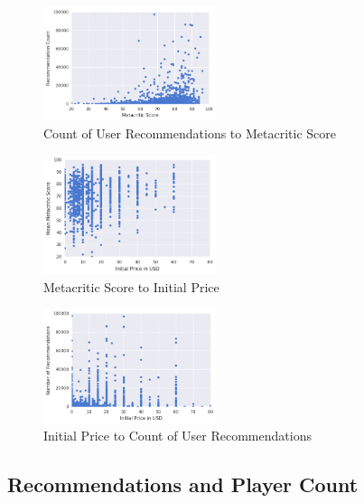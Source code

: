 \documentclass[10pt,journal,compsoc]{IEEEtran}
\begin{document}

\begin{figure}[h]
    \caption{Count of User Recommendations to Metacritic Score \label{fig:metacritic-recommendations}}
    \includegraphics[width=0.45\textwidth,keepaspectratio]{metacritic-recommendations-scatter}
\end{figure}

\begin{figure}[h]
    \caption{Metacritic Score to Initial Price \label{fig:metacritic-price}}
    \includegraphics[width=0.45\textwidth,keepaspectratio]{price-metacritic-scatter}
\end{figure}

\begin{figure}[h]
    \caption{Initial Price to Count of User Recommendations \label{fig:price-recommendations}}
    \includegraphics[width=0.45\textwidth,keepaspectratio]{price-recommendations-scatter}
\end{figure}

\subsection{Recommendations and Player Count}
\end{document}
